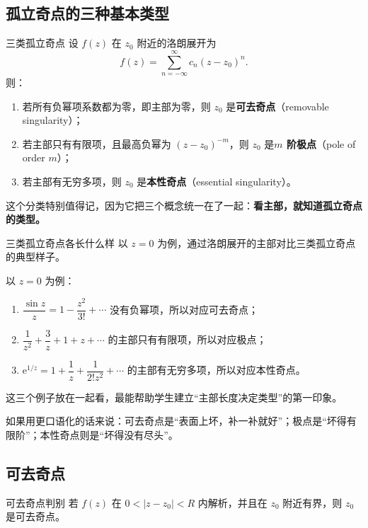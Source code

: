 \subsection{孤立奇点的三种基本类型}

\begin{dingliyi}{三类孤立奇点}{}
设 $f(z)$ 在 $z_0$ 附近的洛朗展开为
\[
    f(z)=\sum_{n=-\infty}^{\infty} c_n (z-z_0)^n.
\]
则：
\begin{enumerate}
    \item 若所有负幂项系数都为零，即主部为零，则 $z_0$ 是\textbf{可去奇点}（removable singularity）；
    \item 若主部只有有限项，且最高负幂为 $(z-z_0)^{-m}$，则 $z_0$ 是\textbf{$m$ 阶极点}（pole of order $m$）；
    \item 若主部有无穷多项，则 $z_0$ 是\textbf{本性奇点}（essential singularity）。
\end{enumerate}
\end{dingliyi}

这个分类特别值得记，因为它把三个概念统一在了一起：\textbf{看主部，就知道孤立奇点的类型。}

\begin{lizi}{三类孤立奇点各长什么样}{}
以 $z=0$ 为例，通过洛朗展开的主部对比三类孤立奇点的典型样子。

\begin{jie}
以 $z=0$ 为例：
\begin{enumerate}
    \item $\dfrac{\sin z}{z}=1-\dfrac{z^2}{3!}+\cdots$ 没有负幂项，所以对应可去奇点；
    \item $\dfrac{1}{z^2}+\dfrac{3}{z}+1+z+\cdots$ 的主部只有有限项，所以对应极点；
    \item $\mathrm{e}^{1/z}=1+\dfrac{1}{z}+\dfrac{1}{2!z^2}+\cdots$ 的主部有无穷多项，所以对应本性奇点。
\end{enumerate}

这三个例子放在一起看，最能帮助学生建立``主部长度决定类型''的第一印象。
\end{jie}
\end{lizi}

如果用更口语化的话来说：可去奇点是``表面上坏，补一补就好''；极点是``坏得有限阶''；本性奇点则是``坏得没有尽头''。

\subsection{可去奇点}

\begin{dingli}{可去奇点判别}{}
若 $f(z)$ 在 $0<|z-z_0|<R$ 内解析，并且在 $z_0$ 附近有界，则 $z_0$ 是可去奇点。
\end{dingli}

